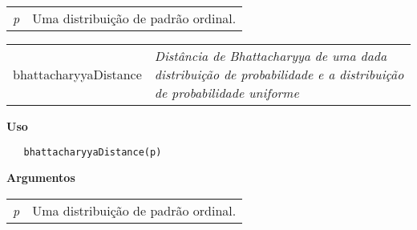 \begin{table}[!ht]
\begin{center}
\begin{tabularx}{\textwidth}{X X}
\hspace{0.5cm} \textit{p} & Uma distribuição de padrão ordinal.\\
\end{tabularx}
\end{center}
\end{table} 

\newpage


\hrulefill   

\begin{table}[!ht]
\begin{center}
\begin{tabularx}{\textwidth}{ X X}
\hspace{0.5cm} bhattacharyyaDistance & \textit{Distância de Bhattacharyya de uma dada distribuição de probabilidade e a distribuição de probabilidade uniforme}\\
\end{tabularx}
\end{center}
\end{table} 

\vspace{-0.5cm}

\hrulefill  

\vspace{0.5cm}

\textbf{Uso}

\begin{lstlisting}
   bhattacharyyaDistance(p)
\end{lstlisting}

\vspace{0.5cm}

\textbf{Argumentos}

\begin{table}[!ht]
\begin{center}
\begin{tabularx}{\textwidth}{X X}
\hspace{0.5cm} \textit{p} & Uma distribuição de padrão ordinal.\\
\end{tabularx}
\end{center}
\end{table} 

